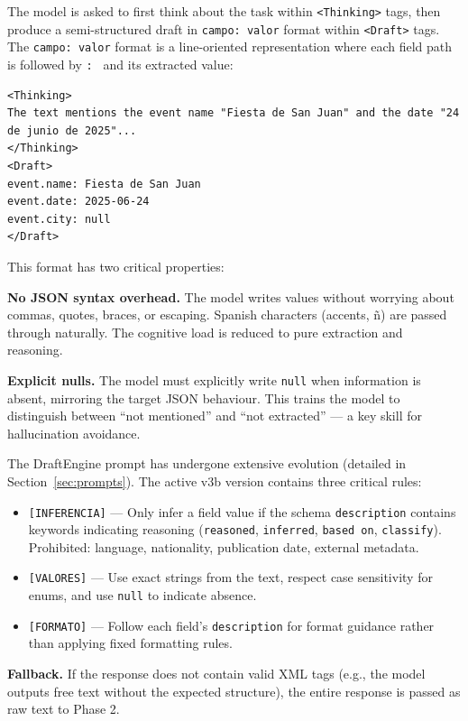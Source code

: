 \documentclass{ceurart}
\begin{document}
The model is asked to first think about the task within \texttt{<Thinking>} tags, then
produce a semi-structured draft in \texttt{campo: valor} format within \texttt{<Draft>}
tags.
The \texttt{campo: valor} format is a line-oriented representation where each field
path is followed by \texttt{: } and its extracted value:

\begin{lstlisting}
<Thinking>
The text mentions the event name "Fiesta de San Juan" and the date "24 de junio de 2025"...
</Thinking>
<Draft>
event.name: Fiesta de San Juan
event.date: 2025-06-24
event.city: null
</Draft>
\end{lstlisting}

This format has two critical properties:

\textbf{No JSON syntax overhead.}
The model writes values without worrying about commas, quotes, braces, or escaping.
Spanish characters (accents, \~n) are passed through naturally.
The cognitive load is reduced to pure extraction and reasoning.

\textbf{Explicit nulls.}
The model must explicitly write \texttt{null} when information is absent, mirroring the
target JSON behaviour.
This trains the model to distinguish between ``not mentioned'' and ``not extracted''
--- a key skill for hallucination avoidance.

The DraftEngine prompt has undergone extensive evolution (detailed in
Section~\ref{sec:prompts}).
The active v3b version contains three critical rules:

\begin{itemize}
\item \texttt{[INFERENCIA]} --- Only infer a field value if the schema
  \texttt{description} contains keywords indicating reasoning (\texttt{reasoned},
  \texttt{inferred}, \texttt{based on}, \texttt{classify}).
  Prohibited: language, nationality, publication date, external metadata.
\item \texttt{[VALORES]} --- Use exact strings from the text, respect case sensitivity
  for enums, and use \texttt{null} to indicate absence.
\item \texttt{[FORMATO]} --- Follow each field's \texttt{description} for format
  guidance rather than applying fixed formatting rules.
\end{itemize}

\textbf{Fallback.}
If the response does not contain valid XML tags (e.g., the model outputs free text
without the expected structure), the entire response is passed as raw text to Phase 2.
\end{document}
